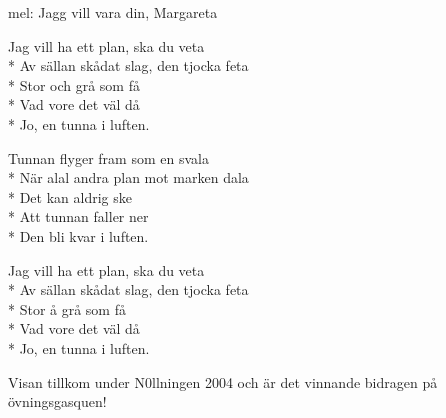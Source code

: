 \begin{SongText}
    \begin{SongInfo}
        mel: Jagg vill vara din, Margareta
    \end{SongInfo}
    \begin{SongVerse}
        Jag vill ha ett plan, ska du veta\\*%
        Av sällan skådat slag, den tjocka feta\\*%
        Stor och grå som få\\*%
        Vad vore det väl då\\*%
        Jo, en tunna i luften.
    \end{SongVerse}
    \begin{SongVerse}
        Tunnan flyger fram som en svala\\*%
        När alal andra plan mot marken dala\\*%
        Det kan aldrig ske\\*%
        Att tunnan faller ner\\*%
        Den bli kvar i luften.
    \end{SongVerse}
    \begin{SongVerse}
        Jag vill ha ett plan, ska du veta\\*%
        Av sällan skådat slag, den tjocka feta\\*%
        Stor å grå som få\\*%
        Vad vore det väl då\\*%
        Jo, en tunna i luften.
    \end{SongVerse}
    \begin{SongInfo}
        Visan tillkom under N0llningen 2004 och är det vinnande bidragen på övningsgasquen!
    \end{SongInfo}
\end{SongText}

